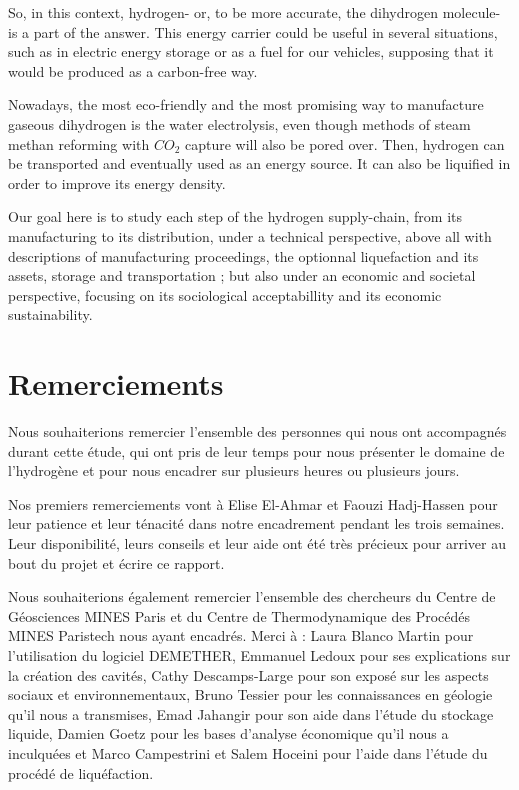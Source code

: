 \documentclass[11pt,french,a4paper]{article}
\begin{document}
So, in this context, hydrogen- or, to be more accurate, the dihydrogen molecule- is a part of the answer. This energy carrier could be useful in several situations, such as in electric energy storage or as a fuel for our vehicles, supposing that it would be produced as a carbon-free way.

Nowadays, the most eco-friendly and the most promising way to manufacture gaseous dihydrogen is the water electrolysis, even though methods of steam methan reforming with $CO_2$ capture will also be pored over. Then, hydrogen can be transported and eventually used as an energy source. It can also be liquified in order to improve its energy density.

Our goal here is to study each step of the hydrogen supply-chain, from its manufacturing to its distribution, under a technical perspective, above all with descriptions of manufacturing proceedings, the optionnal liquefaction and its assets, storage and transportation ; but also  under an economic and societal perspective, focusing on its sociological acceptabillity and its economic sustainability.


\section*{Remerciements}
Nous souhaiterions remercier l’ensemble des personnes qui nous ont accompagnés durant cette étude, qui ont pris de leur temps pour nous présenter le domaine de l’hydrogène et pour nous encadrer sur plusieurs heures ou plusieurs jours.

Nos premiers remerciements vont à Elise El-Ahmar et Faouzi Hadj-Hassen pour leur patience et leur ténacité dans notre encadrement pendant les trois semaines. Leur disponibilité, leurs conseils et leur aide ont été très précieux pour arriver au bout du projet et écrire ce rapport. 

Nous souhaiterions également remercier l’ensemble des chercheurs du Centre de Géosciences MINES Paris et du Centre de Thermodynamique des Procédés MINES Paristech nous ayant encadrés. Merci à : Laura Blanco Martin pour l’utilisation du logiciel DEMETHER, Emmanuel Ledoux pour ses explications sur la création des cavités, Cathy Descamps-Large pour son exposé sur les aspects sociaux et environnementaux, Bruno Tessier pour les connaissances en géologie qu’il nous a transmises, Emad Jahangir pour son aide dans l’étude du stockage liquide, Damien Goetz pour les bases d’analyse économique qu’il nous a inculquées et Marco Campestrini  et Salem Hoceini pour l’aide dans l’étude du procédé de liquéfaction.
\end{document}
